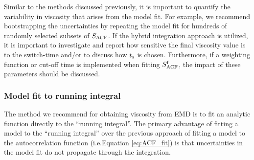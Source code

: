 \documentclass[9pt,bestpractices]{livecoms}
\providecommand{\DIFadd}[1]{{\protect\color{blue}\uwave{#1}}} %
\providecommand{\DIFaddbegin}{} %
\providecommand{\DIFaddend}{} %
\begin{document}


Similar to the methods discussed previously, it is important to quantify the variability in viscosity that arises from the model fit. For example, we recommend bootstrapping the uncertainties by repeating the model fit for hundreds of randomly selected subsets of $S_{\rm ACF}$. If the hybrid integration approach is utilized, it is important to investigate and report how sensitive the final viscosity value is to the switch-time and/or to discuss how $t_{\rm s}$ is chosen. Furthermore, if a weighting function or cut-off time is implemented when fitting $S^{\rm f}_{\rm ACF}$, the impact of these parameters should be discussed.

%
%

%

\subsubsection*{Model fit to running integral}

The method we recommend for obtaining viscosity from EMD is to fit an analytic function directly to the ``running integral''. The primary advantage of fitting a model to the ``running integral'' over the previous approach of fitting a model to the autocorrelation function (i.e.\DIFaddbegin \DIFadd{, }\DIFaddend Equation \ref{eq:ACF_fit}) is that uncertainties in the model fit do not propagate through the integration. 
\end{document}
